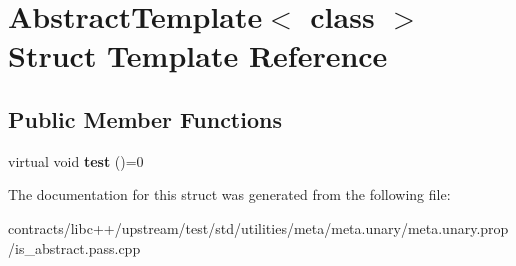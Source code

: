 \hypertarget{struct_abstract_template}{}\section{Abstract\+Template$<$ class $>$ Struct Template Reference}
\label{struct_abstract_template}
\subsection*{Public Member Functions}
\begin{DoxyCompactItemize}
\item 
\mbox{\label{struct_abstract_template_a5fa3b929c3e668b4f916ec261d4ad4b3}} 
virtual void {\bfseries test} ()=0
\end{DoxyCompactItemize}


The documentation for this struct was generated from the following file\+:\begin{DoxyCompactItemize}
\item 
contracts/libc++/upstream/test/std/utilities/meta/meta.\+unary/meta.\+unary.\+prop/is\+\_\+abstract.\+pass.\+cpp\end{DoxyCompactItemize}
